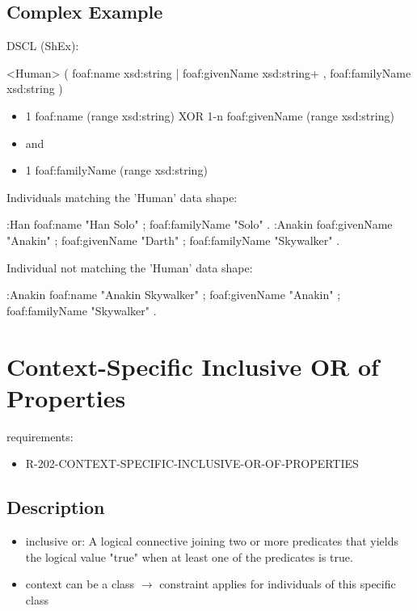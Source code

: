 \documentclass{llncs}
\newcommand{\tb}[1]{\todo[size=\small, color=blue!40]{\textbf{Thomas:} #1}}
\begin{document}
\subsection{Complex Example}

DSCL (ShEx):

\begin{ex}
<Human> { (  
    foaf:name xsd:string | foaf:givenName xsd:string+ , 
    foaf:familyName xsd:string ) }
\end{ex}

\begin{itemize}
	\item 1 foaf:name (range xsd:string) XOR 1-n foaf:givenName (range xsd:string)
	\item and
	\item 1 foaf:familyName (range xsd:string)
\end{itemize}

\tb{ToDo: DL}

Individuals matching the 'Human' data shape:

\begin{ex}
:Han
    foaf:name "Han Solo" ;
    foaf:familyName "Solo" .
:Anakin
    foaf:givenName "Anakin" ;
    foaf:givenName "Darth" ;
    foaf:familyName "Skywalker" .
\end{ex}

Individual not matching the 'Human' data shape:

\begin{ex}
:Anakin
    foaf:name "Anakin Skywalker" ;
    foaf:givenName "Anakin" ;
    foaf:familyName "Skywalker" .
\end{ex}

\section{Context-Specific Inclusive OR of Properties}

requirements:

\begin{itemize}
	\item R-202-CONTEXT-SPECIFIC-INCLUSIVE-OR-OF-PROPERTIES
\end{itemize}

\subsection{Description}

\begin{itemize}
	\item inclusive or: A logical connective joining two or more predicates that yields the logical value "true" when at least one of the predicates is true.
	\item context can be a class $\rightarrow$ constraint applies for individuals of this specific class 
\end{itemize}
\end{document}
